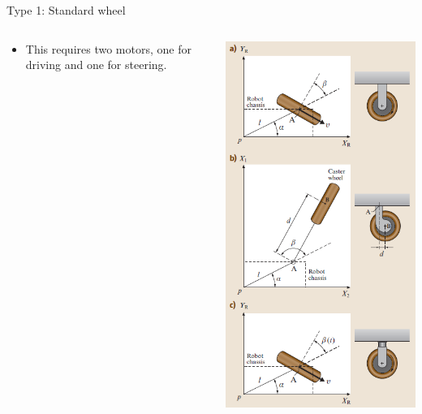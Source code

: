 \documentclass[compress]{beamer}
\begin{document}
\begin{frame}{Type 1: Standard wheel}
{\begin{columns}
\begin{column}{0.5\linewidth}
                \begin{itemize}
                    \item This requires two motors, one for driving and one for steering.
                \end{itemize}
            \end{column}
            \begin{column}{0.5\linewidth}
                \begin{center}
                    \includegraphics[width=0.7\linewidth]{std_wheel2}
                \end{center}
            \end{column}
        \end{columns}
    }

\end{frame}
\end{document}
